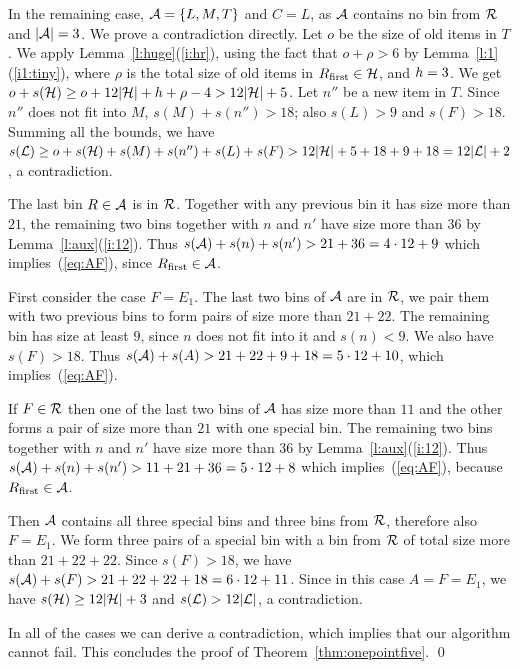 In the remaining case, ${\mathcal A}=\{L,M,T\}$ and $C=L$, as ${\mathcal A}$
contains no bin from ${\mathcal R}$ and $|{\mathcal A}|=3$.  We prove a
contradiction directly. Let $o$ be the size of old items in $T$.  We
apply Lemma~\ref{l:huge}(\ref{i:hr}), using the fact that $o+\rho>6$
by Lemma~\ref{l:1}(\ref{i1:tiny}), where $\rho$ is the total size of
old items in $R_{\mbox{\rm\scriptsize first}}\in{\mathcal H}$, and ${h}=3$. We get
$o+s({\mathcal H})\geq o+12|{\mathcal H}|+{h}+\rho-4>12|{\mathcal H}|+5$.  Let $n''$
be a new item in $T$. Since $n''$ does not fit into $M$,
$s(M)+s(n'')>18$; also $s(L)>9$ and $s(F)>18$. Summing all the bounds,
we have $s({\mathcal L})\geq o+s({\mathcal H})+s(M)+s(n'')+s(L)+s(F)
>12|{\mathcal H}|+5+18+9+18=12|{\mathcal L}|+2$, a contradiction.

The last bin $R\in{\mathcal A}$ is in
${\mathcal R}$. Together with any previous bin it has size more than $21$,
the remaining two bins together with $n$ and $n'$ have size more than
$36$ by Lemma~\ref{l:aux}(\ref{i:12}). 
Thus $s({\mathcal A})+s(n)+s(n')>21+36=4\cdot12+9$ which implies~(\ref{eq:AF}),
since $R_{\mbox{\rm\scriptsize first}}\in{\mathcal A}$.

First consider the case $F=E_1$. 
The last two bins of ${\mathcal A}$ are in ${\mathcal R}$, we pair
them with two previous bins to form pairs of size more than $21 + 22$.
The remaining bin has size at least $9$,
since $n$ does not fit into it and $s(n)<9$. We also have
$s(F)>18$. Thus $s({\mathcal A})+s(A)>21+22+9+18=5\cdot12+10$, which
implies~(\ref{eq:AF}).

If $F\in{\mathcal R}$ then one of the last two bins of ${\mathcal A}$ has size more
than $11$ and the other forms a pair of size more than $21$ with one
special bin. The remaining two bins together with $n$ and $n'$ have
size more than 36 by Lemma~\ref{l:aux}(\ref{i:12}). Thus
$s({\mathcal A})+s(n)+s(n')>11+21+36=5\cdot12+8$ which implies~(\ref{eq:AF}),
because $R_{\mbox{\rm\scriptsize first}}\in{\mathcal A}$.

 Then ${\mathcal A}$ contains all three special
bins and three bins from ${\mathcal R}$, therefore also $F=E_1$. We form
three pairs of a special bin with a bin from ${\mathcal R}$ of total size
more than $21+22+22$. Since $s(F)>18$, we have
$s({\mathcal A})+s(F)>21+22+22+18=6\cdot12+11$.  Since in this case
$A=F=E_1$, we have $s({\mathcal H})\geq 12|{\mathcal H}|+3$ and
$s({\mathcal L})>12|{\mathcal L}|$, a contradiction.

In all of the cases we can derive a contradiction, which implies
that our algorithm cannot fail. This concludes the proof of
Theorem~\ref{thm:onepointfive}. \qed